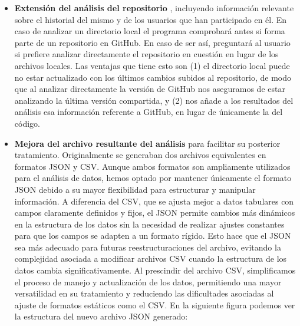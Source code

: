 \documentclass[a4paper, 12pt]{book}
\begin{document}
\begin{itemize}
    \item \textbf{Extensión del análisis del repositorio }, incluyendo información relevante sobre el historial del mismo y de los usuarios que han participado en él. En caso de analizar un directorio local el programa comprobará antes si forma parte de un repositorio en GitHub. En caso de ser así, preguntará al usuario si prefiere analizar directamente el repositorio en cuestión en lugar de los archivos locales. Las ventajas que tiene esto son (1) el directorio local puede no estar actualizado con los últimos cambios subidos al repositorio, de modo que al analizar directamente la versión de GitHub nos aseguramos de estar analizando la última versión compartida, y (2) nos añade a los resultados del análisis esa información referente a GitHub, en lugar de únicamente la del código.

    \item \textbf{Mejora del archivo resultante del análisis} para facilitar su posterior tratamiento. Originalmente se generaban dos archivos equivalentes en formatos JSON y CSV. Aunque ambos formatos son ampliamente utilizados para el análisis de datos, hemos optado por mantener únicamente el formato JSON debido a su mayor flexibilidad para estructurar y manipular información. A diferencia del CSV, que se ajusta mejor a datos tabulares con campos claramente definidos y fijos, el JSON permite cambios más dinámicos en la estructura de los datos sin la necesidad de realizar ajustes constantes para que los campos se adapten a un formato rígido. Esto hace que el JSON sea más adecuado para futuras reestructuraciones del archivo, evitando la complejidad asociada a modificar archivos CSV cuando la estructura de los datos cambia significativamente. Al prescindir del archivo CSV, simplificamos el proceso de manejo y actualización de los datos, permitiendo una mayor versatilidad en su tratamiento y reduciendo las dificultades asociadas al ajuste de formatos estáticos como el CSV. En la siguiente figura podemos ver la estructura del nuevo archivo JSON generado:

    \newpage
    

\end{itemize}
\end{document}
